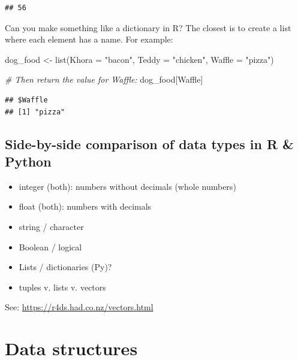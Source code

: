 \documentclass[
]{book}
\newenvironment{Shaded}{\begin{snugshade}}{\end{snugshade}}
\newcommand{\AttributeTok}[1]{\textcolor[rgb]{0.77,0.63,0.00}{#1}}
\newcommand{\CommentTok}[1]{\textcolor[rgb]{0.56,0.35,0.01}{\textit{#1}}}
\newcommand{\FunctionTok}[1]{\textcolor[rgb]{0.00,0.00,0.00}{#1}}
\newcommand{\NormalTok}[1]{#1}
\newcommand{\OtherTok}[1]{\textcolor[rgb]{0.56,0.35,0.01}{#1}}
\newcommand{\StringTok}[1]{\textcolor[rgb]{0.31,0.60,0.02}{#1}}
\providecommand{\tightlist}{%
  \setlength{\itemsep}{0pt}\setlength{\parskip}{0pt}}
\begin{document}
\begin{verbatim}
## 56
\end{verbatim}

Can you make something like a dictionary in R? The closest is to create a list where each element has a name. For example:

\begin{Shaded}
\begin{Highlighting}[]
\NormalTok{dog\_food }\OtherTok{\textless{}{-}} \FunctionTok{list}\NormalTok{(}\AttributeTok{Khora =} \StringTok{"bacon"}\NormalTok{, }\AttributeTok{Teddy =} \StringTok{"chicken"}\NormalTok{, }\AttributeTok{Waffle =} \StringTok{"pizza"}\NormalTok{)}

\CommentTok{\# Then return the value for Waffle:}
\NormalTok{dog\_food[}\StringTok{\textquotesingle{}Waffle\textquotesingle{}}\NormalTok{]}
\end{Highlighting}
\end{Shaded}

\begin{verbatim}
## $Waffle
## [1] "pizza"
\end{verbatim}

\hypertarget{side-by-side-comparison-of-data-types-in-r-python}{%
\subsection{Side-by-side comparison of data types in R \& Python}\label{side-by-side-comparison-of-data-types-in-r-python}}

\begin{itemize}
\tightlist
\item
  integer (both): numbers without decimals (whole numbers)
\item
  float (both): numbers with decimals
\item
  string / character
\item
  Boolean / logical
\item
  Lists / dictionaries (Py)?
\item
  tuples v. lists v. vectors
\end{itemize}

See: \url{https://r4ds.had.co.nz/vectors.html}

\hypertarget{data-structures}{%
\section{Data structures}\label{data-structures}}
\end{document}
